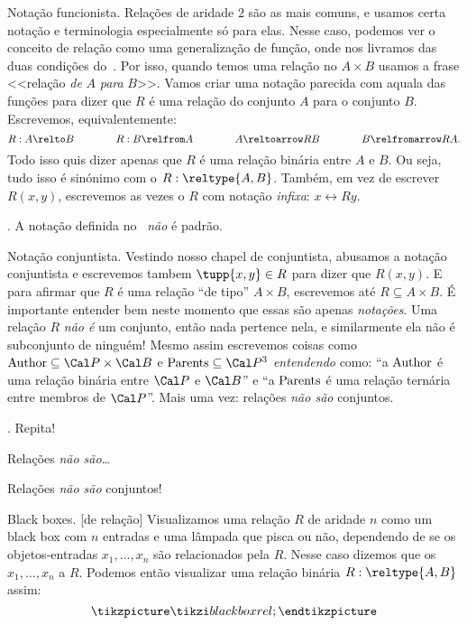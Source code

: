 \note Notação funcionista.
\label{funlike_notation_for_relations}%
Relações de aridade $2$ são as mais comuns, e usamos certa notação
e terminologia especialmente só para elas.
Nesse caso, podemos ver o conceito de relação como uma generalização de função,
onde nos livramos das duas condições do~.
Por isso, quando temos uma relação no $A\times B$
usamos a frase <<relação \emph{de} $A$ \emph{para} $B$>>.
Vamos criar uma notação parecida com aquala das funções para dizer que $R$
é uma relação do conjunto $A$ para o conjunto $B$.
Escrevemos, equivalentemente:
$$
R : A \relto B
\qqqquad
R : B \relfrom A
\qqqquad
A \reltoarrow R B
\qqqquad
B \relfromarrow R A.
$$
Todo isso quis dizer apenas que $R$ é uma relação binária entre $A$ e $B$.
Ou seja, tudo isso é sinónimo com o $R : \reltype{A,B}$.
Também, em vez de escrever $R(x,y)$, escrevemos as vezes
o $R$ com notação \emph{infixa}: $x \rel R y$.

\beware.
A notação definida no~
\emph{não} é padrão.

\note Notação conjuntista.
\label{setlike_notation_for_relations}%
Vestindo nosso chapel de conjuntista, abusamos a notação conjuntista e escrevemos
tambem $\tupp{x,y} \in R$ para dizer que $R(x,y)$.
E para afirmar que $R$ é uma relação ``de tipo'' $A\times B$, escrevemos
até $R \subseteq A\times B$.
É importante entender bem neste momento que essas são apenas
\emph{notações}.  Uma relação $R$ \emph{não é} um conjunto, então nada pertence nela,
e similarmente ela não é subconjunto de ninguém!
Mesmo assim escrevemos coisas como
$\namedpred{Author} \subseteq \cal P \times \cal B$
e
$\namedpred{Parents} \subseteq \cal P^3$
\emph{entendendo} como: ``a $\mathop{\rm Author}\nolimits$ é uma relação binária
entre $\cal P$ e $\cal B$'' e ``a $\mathop{\rm Parents}\nolimits$ é uma relação
ternária entre membros de $\cal P$''.
Mais uma vez: relações \emph{não são} conjuntos.

\exercise.
\label{repeat_after_me_relations_are_not_sets}%
Repita!

\hint
Relações \emph{não são}\dots

\solution
Relações \emph{não são} conjuntos!

\endexercise

\note Black boxes.
\label{blackbox_rel}%
[de relação]%
%
Visualizamos uma relação $R$ de aridade $n$ como um black box com $n$ entradas
e uma lâmpada que pisca ou não, dependendo de se os objetos-entradas
$x_1,\dotsc,x_n$ são relacionados pela $R$.
Nesse caso dizemos que os $x_1,\dotsc,x_n$  a $R$.
Podemos então visualizar uma relação binária $R : \reltype{A,B}$ assim:
$$
\tikzpicture
\tikzi blackboxrel;
\endtikzpicture
$$

